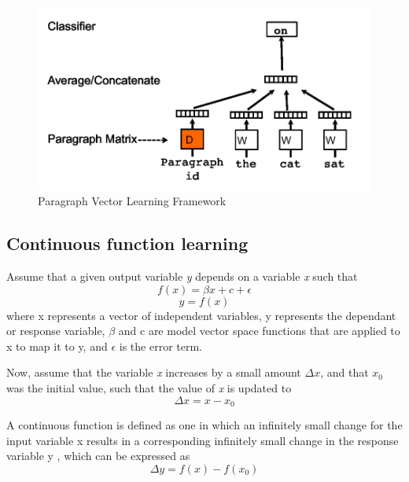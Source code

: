 \documentclass[conference]{IEEEtran}
\begin{document}
\begin{figure}[ht]
\centering
\includegraphics[width=400pt]{images/docvec_1.png}
\caption{Paragraph Vector Learning Framework\cite{mikolov2013distributed}}
\label{fig:paragraph-vector-framework}
\end{figure}


\subsection{Continuous function learning}
Assume that a given output variable \textit{y} depends on a variable \textit{x} such that
\begin{equation}
    \displaystyle f(x) = \beta x + c + \epsilon
\end{equation}
\begin{equation}
    \displaystyle y = f(x)
\end{equation}
where x represents a vector of independent variables, y represents the dependant or response variable, $\beta$ and c are model vector space functions that are applied to x to map it to y, and $\epsilon$ is the error term.

Now, assume that the variable \textit{x} increases by a small amount $\Delta x$, and that $x_0$ was the initial value, such that the value of \textit{x} is updated to
\begin{equation}
\displaystyle \Delta x = x - x_0
\end{equation}

A continuous function is defined as one in which an infinitely small change for the input variable x results in a corresponding infinitely small change in the response variable y \cite{continuous_function}, which can be expressed as
\begin{equation}
\displaystyle \Delta y = f(x) - f(x_0)
\end{equation}
\end{document}
